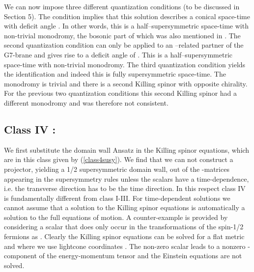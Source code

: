 \documentclass[12pt,a4paper]{article}
\begin{document}
We can now impose three different quantization conditions (to be discussed in Section 5).
The condition \coordHE{} implies that this solution describes a conical space-time
with deficit angle \coordHE{}. In other words, this is a half--supersymmetric 
\coordHE{} space-time with non-trivial monodromy, 
the bosonic part of which was also mentioned in \cite{Greene:1990ya}. The second
quantization condition \coordHE{} can only be applied to an 
\coordHE{}--related partner of the G7-brane and gives rise to a deficit
angle of \coordHE{}. This is a half--supersymmetric 
\coordHE{} space-time with non-trivial monodromy.
The third quantization condition \coordHE{} yields the identification 
\myHighlight{$\theta \sim \theta + 2 \pi$}\coordHE{} and indeed this is fully supersymmetric \coordHE{} space-time. 
The monodromy is trivial and there is a second Killing spinor \coordHE{} 
with opposite chirality. For the previous two quantization conditions this second
Killing spinor had a different monodromy and was therefore not consistent.


\subsection{Class IV : \coordHE{}}

We first substitute the domain wall Ansatz in the Killing spinor
equations, which are in this class given by (\ref{class4susy}). We
find that we can not construct a projector, yielding a 1/2
supersymmetric domain wall, out of the \myHighlight{$\Gamma$}\coordHE{}-matrices appearing
in the supersymmetry rules unless the scalars have a
time-dependence, i.e. the transverse direction has to be the time
direction. In this respect class IV is fundamentally different from
class I-III. For time-dependent solutions we cannot assume that a
solution to the Killing spinor equations is automatically a
solution to the full equations of motion. A counter-example is
provided by considering a scalar \myHighlight{$\Phi$}\coordHE{} that does only occur in
the transformations of the spin-1/2 fermions as \myHighlight{$(\not \!\! \partial
\Phi)\epsilon$}\coordHE{}. Clearly the Killing spinor equations can be solved
for a flat metric and \coordHE{} where
we use lightcone coordinates \coordHE{}. The non-zero
scalar leads to a nonzero \coordHE{}-component of the energy-momentum
tensor and the Einstein equations are not solved.
\end{document}
